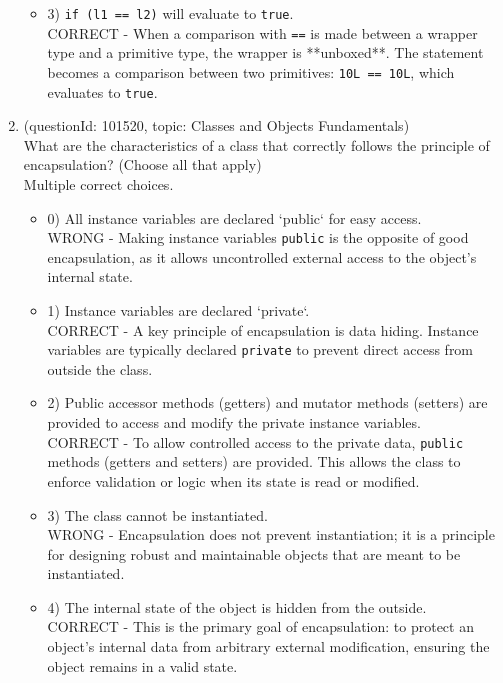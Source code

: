 \documentclass[12pt]{article}
\begin{document}
\begin{enumerate}[label=(\arabic*)]
\begin{itemize}
\item 3) \verb|if (l1 == l2)| will evaluate to \verb|true|.
 \\ 
CORRECT - When a comparison with \verb|==| is made between a wrapper type and a primitive type, the wrapper is **unboxed**. The statement becomes a comparison between two primitives: \verb|10L == 10L|, which evaluates to \verb|true|.

\end{itemize}
\item (questionId: 101520, topic: Classes and Objects Fundamentals) \\ 
What are the characteristics of a class that correctly follows the principle of encapsulation? (Choose all that apply)
\\ \noindent Multiple correct choices. 
\begin{itemize}
\item 0) All instance variables are declared `public` for easy access.
 \\ 
WRONG - Making instance variables \verb|public| is the opposite of good encapsulation, as it allows uncontrolled external access to the object's internal state.

\item 1) Instance variables are declared `private`.
 \\ 
CORRECT - A key principle of encapsulation is data hiding. Instance variables are typically declared \verb|private| to prevent direct access from outside the class.

\item 2) Public accessor methods (getters) and mutator methods (setters) are provided to access and modify the private instance variables.
 \\ 
CORRECT - To allow controlled access to the private data, \verb|public| methods (getters and setters) are provided. This allows the class to enforce validation or logic when its state is read or modified.

\item 3) The class cannot be instantiated.
 \\ 
WRONG - Encapsulation does not prevent instantiation; it is a principle for designing robust and maintainable objects that are meant to be instantiated.

\item 4) The internal state of the object is hidden from the outside.
 \\ 
CORRECT - This is the primary goal of encapsulation: to protect an object's internal data from arbitrary external modification, ensuring the object remains in a valid state.


\end{itemize}
\end{enumerate}
\end{document}
